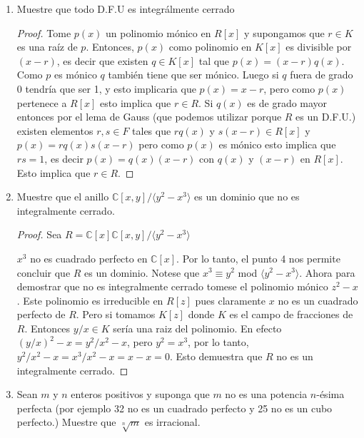 \documentclass[letter,twoside,12pt]{article}
\begin{document}
\begin{enumerate}
\begin{enumerate}
\item  Muestre que todo D.F.U es integrálmente cerrado
\begin{proof}
Tome $  p(x)  $ un polinomio mónico en $ R[x] $ y supongamos que $ r \in K $ es una raíz de $ p $. Entonces, $ p(x) $ como polinomio en $ K[x] $ es divisible por $ (x-r) $, es decir que existen $ q \in K[x] $ tal que $ p(x)=(x-r)q(x) $. Como $ p $ es mónico $ q $ también tiene que ser mónico. Luego si $ q $ fuera de grado 0 tendría que ser 1, y esto implicaria que $ p(x)=x-r $, pero como $ p(x) $ pertenece a $ R[x] $ esto implica que $ r \in R $. Si $ q(x) $ es de grado mayor entonces por el lema de Gauss (que podemos utilizar porque $ R $ es un D.F.U.) existen elementos $ r,s \in F $ tales que $ rq(x)$ y $ s(x-r) \in R[x] $ y $ p(x)=rq(x)s(x-r) $ pero como $ p(x) $ es mónico esto implica que $ rs =1 $, es decir $ p(x)=q(x)(x-r) $ con $ q(x) $ y $ (x-r) $ en $ R[x] $. Esto implica que $ r \in R $.
\end{proof}
\item  Muestre que el anillo $ \mathbb{C}[x,y]/\langle y^2-x^3\rangle $ es un dominio que no es integralmente cerrado.

\begin{proof}
Sea $ R = \mathbb{C}[x]\mathbb{C}[x,y]/\langle y^2-x^3\rangle $

$ x^3 $ no es cuadrado perfecto en $ \mathbb{C}[x] $. Por lo tanto, el punto 4 nos permite concluir que $ R $ es un dominio. Notese que $ x^3 \equiv y^2 $ mod $ \langle y^2-x^3\rangle$. Ahora para demostrar que no es integralmente cerrado tomese el polinomio mónico $ z^2-x $. Este polinomio es irreducible en $ R[z] $ pues claramente $x$ no es un cuadrado perfecto de $ R $. Pero si tomamos $ K[z] $ donde $ K $ es el campo de fracciones de $ R $. Entonces $ y/x  \in K$ sería una raiz del polinomio. En efecto $ (y/x)^2 -x = y^2/x^2-x$, pero $ y^2 = x^3 $, por lo tanto, $ y^2/x^2-x = x^3/x^2-x=x-x=0 $. Esto demuestra que $ R $ no es un integralmente cerrado.
\end{proof}

\item  Sean $ m $ y $ n $ enteros positivos y suponga que $ m $ no es una potencia $ n $-ésima perfecta (por ejemplo 32
no es un cuadrado perfecto y 25 no es un cubo perfecto.) Muestre que $ \sqrt[n]{m} $ es irracional.


\end{enumerate}
\end{enumerate}
\end{document}
